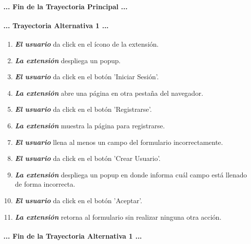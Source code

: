 \documentclass[12pt, a4paper, titlepage]{report}
\begin{document}
				\paragraph{... Fin de la Trayectoria Principal ...}
				
				
				\paragraph{... Trayectoria Alternativa 1 ...}
				\begin{enumerate}
				    
				    \item \textbf{\textit{El usuario}} da click en el ícono de la extensión.
				    
				    \item \textbf{\textit{La extensión}} despliega un popup.
					
					\item \textbf{\textit{El usuario}} da click en el botón 'Iniciar Sesión'.
					
					\item \textbf{\textit{La extensión}} abre una página en otra pestaña del navegador.
					
					\item \textbf{\textit{El usuario}} da click en el botón 'Registrarse'.
					
					\item \textbf{\textit{La extensión}} muestra la página para registrarse.
					
					\item \textbf{\textit{El usuario}} llena al menos un campo del formulario incorrectamente.
					
					\item \textbf{\textit{El usuario}} da click en el botón 'Crear Usuario'.
					
					\item \textbf{\textit{La extensión}} despliega un popup en donde informa cuál campo está llenado de forma incorrecta.
					
					\item \textbf{\textit{El usuario}} da click en el botón 'Aceptar'.
					
					\item \textbf{\textit{La extensión}} retorna al formulario sin realizar ninguna otra acción.
				\end{enumerate}
				\paragraph{... Fin de la Trayectoria Alternativa 1 ...}
				
\end{document}
